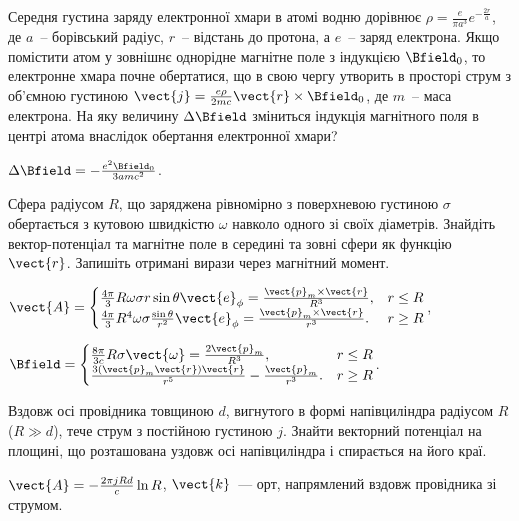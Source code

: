 \begin{problem} %
Середня густина заряду електронної хмари в атомі водню дорівнює $\rho = \frac{e}{\pi a^3}e^{-\frac{2r}{a}}$, де $ a $~-- борівський радіус, $ r $~-- відстань до протона, а $e$~-- заряд електрона. Якщо помістити атом у зовнішнє однорідне магнітне поле з індукцією $\Bfield_0$, то електронне хмара почне обертатися, що в свою чергу утворить в просторі струм з об'ємною густиною $\vect{j} = \frac{e\rho}{2mc} \vect{r}\times \Bfield_0$, де $m$~-- маса електрона. На яку величину $\Delta\Bfield$ зміниться індукція магнітного поля в центрі атома внаслідок обертання електронної хмари?
\begin{solution}
	$\Delta\Bfield = -\frac{e^2 \Bfield_0}{3amc^2}$.
\end{solution}
\end{problem}

\begin{problem}
Сфера радіусом $R$, що заряджена рівномірно з поверхневою густиною $\sigma$ обертається з кутовою швидкістю $\omega$ навколо одного зі своїх діаметрів. Знайдіть вектор-потенціал та магнітне поле в середині та зовні сфери як функцію $\vect{r}$. Запишіть отримані вирази через магнітний момент.
\begin{solution}
	$\vect{A} =
		\begin{cases}
			\frac{4\pi}{3}R\omega\sigma r\sin\theta \vect{e}_{\phi} = \frac{\vect{p}_m\times\vect{r}}{R^3},              & r \le R \\
			\frac{4\pi}{3}R^4\omega\sigma \frac{\sin\theta}{r^2} \vect{e}_{\phi} = \frac{\vect{p}_m\times\vect{r}}{r^3}. & r \ge R \\
		\end{cases}$,

	$\Bfield =
		\begin{cases}
			\frac{8\pi}{3c}R\sigma\vect{\omega} = \frac{2\vect{p}_m}{R^3},     & r \le R \\
			\frac{3(\vect{p}_m\vect{r})\vect{r}}{r^5} -\frac{\vect{p}_m}{r^3}. & r \ge R \\
		\end{cases}$.
\end{solution}
\end{problem}

\begin{problem} %
Вздовж осі провідника товщиною $d$, вигнутого в формі напівциліндра радіусом $R$ ($R \gg d$), тече струм з постійною густиною $j$. Знайти векторний потенціал на площині, що розташована уздовж осі напівциліндра і спирається на його краї.
\begin{solution}
	$\vect{A} = - \frac{2\pi jRd}{c}\ln R$,  $\vect{k}$~--- орт, напрямлений вздовж провідника зі струмом.
\end{solution}
\end{problem}

